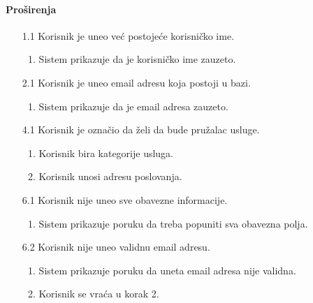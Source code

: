 \documentclass[a4paper,12pt]{report}
\begin{document}
    \paragraph*{Proširenja} 
    \begin{enumerate}
        \item[1.1] Korisnik je uneo već postojeće korisničko ime.
            \begin{enumerate}[noitemsep,topsep=-8pt]
                \item Sistem prikazuje da je korisničko ime zauzeto.
            \end{enumerate}
   
        \item[2.1] Korisnik je uneo email adresu koja postoji u bazi.
        \begin{enumerate}[noitemsep,topsep=-8pt]
            \item Sistem prikazuje da je email adresa zauzeto.
        \end{enumerate}
    
        \item[4.1] Korisnik je označio da želi da bude pružalac usluge.
            \begin{enumerate}[noitemsep,topsep=-8pt]
                \item Korisnik bira kategorije usluga.
                \item Korisnik unosi adresu poslovanja.
            \end{enumerate}
    
        \item[6.1] Korisnik nije uneo sve obavezne informacije.
            \begin{enumerate}[noitemsep,topsep=-8pt]
                \item Sistem prikazuje poruku da treba popuniti sva obavezna polja.
            \end{enumerate}
 
        \item[6.2] Korisnik nije uneo validnu email adresu.
             \begin{enumerate}[noitemsep,topsep=-8pt]
                \item Sistem prikazuje poruku da uneta email adresa nije validna.
                \item Korisnik se vraća u korak 2.
            \end{enumerate}
    \end{enumerate}
    
\end{document}
